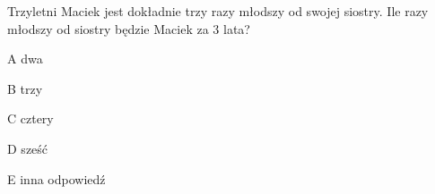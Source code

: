 \begin{tresc}
Trzyletni Maciek jest dokładnie trzy razy młodszy od swojej siostry. Ile razy młodszy od siostry będzie Maciek za 3 lata?
\end{tresc}
\begin{wariant}{A} dwa \end{wariant}
\begin{wariant}{B} trzy \end{wariant}
\begin{wariant}{C} cztery \end{wariant}
\begin{wariant}{D} sześć \end{wariant}
\begin{wariant}{E} inna odpowiedź \end{wariant}
